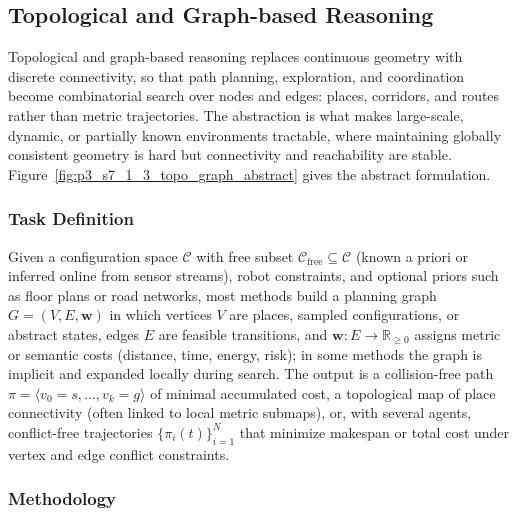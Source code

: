 
\subsection{Topological and Graph-based Reasoning}
\label{subsec:p3_s7_1_3}

Topological and graph-based reasoning replaces continuous geometry with discrete connectivity, so that path planning, exploration, and coordination become combinatorial search over nodes and edges: places, corridors, and routes rather than metric trajectories. The abstraction is what makes large-scale, dynamic, or partially known environments tractable, where maintaining globally consistent geometry is hard but connectivity and reachability are stable. Figure~\ref{fig:p3_s7_1_3_topo_graph_abstract} gives the abstract formulation.

\subsubsection{Task Definition}
Given a configuration space $\mathcal{C}$ with free subset $\mathcal{C}_{\mathrm{free}} \subseteq \mathcal{C}$ (known a priori or inferred online from sensor streams), robot constraints, and optional priors such as floor plans or road networks, most methods build a planning graph $G=(V,E,\mathbf{w})$ in which vertices $V$ are places, sampled configurations, or abstract states, edges $E$ are feasible transitions, and $\mathbf{w}: E \to \mathbb{R}_{\geq 0}$ assigns metric or semantic costs (distance, time, energy, risk); in some methods the graph is implicit and expanded locally during search. The output is a collision-free path $\pi=\langle v_0=s,\dots,v_k=g\rangle$ of minimal accumulated cost, a topological map of place connectivity (often linked to local metric submaps), or, with several agents, conflict-free trajectories $\{\pi_i(t)\}_{i=1}^N$ that minimize makespan or total cost under vertex and edge conflict constraints.


\subsubsection{Methodology}

